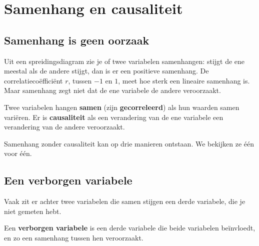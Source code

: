 \begin{oefeningen}
\end{oefeningen}

\section{Samenhang en causaliteit}

\subsection{Samenhang is geen oorzaak}

Uit een spreidingsdiagram zie je of twee variabelen samenhangen: stijgt de ene meestal als de andere stijgt, dan is er een positieve samenhang. De correlatiecoëfficiënt $r$, tussen $-1$ en $1$, meet hoe sterk een lineaire samenhang is. Maar samenhang zegt niet dat de ene variabele de andere veroorzaakt.

\begin{theorie}
Twee variabelen hangen \textbf{\textcolor{accent}{samen}} (zijn \textbf{\textcolor{accent}{gecorreleerd}}) als hun waarden samen variëren. Er is \textbf{\textcolor{accent}{causaliteit}} als een verandering van de ene variabele een verandering van de andere veroorzaakt.
\end{theorie}

Samenhang zonder causaliteit kan op drie manieren ontstaan. We bekijken ze één voor één.

\subsection{Een verborgen variabele}

Vaak zit er achter twee variabelen die samen stijgen een derde variabele, die je niet gemeten hebt.

\begin{theorie}
Een \textbf{\textcolor{accent}{verborgen variabele}} is een derde variabele die beide variabelen beïnvloedt, en zo een samenhang tussen hen veroorzaakt.
\end{theorie}


